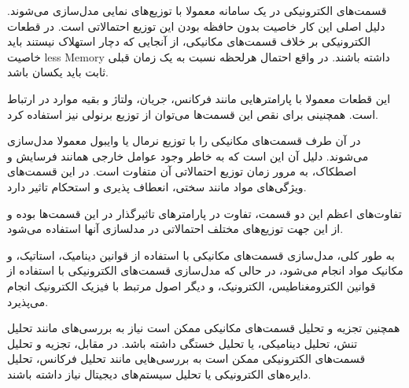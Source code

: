 قسمت‌های الکترونیکی در یک سامانه معمولا با توزیع‌های نمایی مدل‌سازی می‌شوند. دلیل اصلی این کار خاصیت بدون حافظه بودن این توزیع احتمالاتی است. در قطعات الکترونیکی بر خلاف قسمت‌های مکانیکی، از آنجایی که دچار استهلاک نیستند باید خاصیت
less Memory 
داشته باشند. در واقع احتمال هرلحظه نسبت به یک زمان قبلی ثابت باید یکسان باشد.

این قطعات معمولا با پارامترهایی مانند فرکانس، جریان،‌ ولتاژ و بقیه موارد در ارتباط است. همچنینی برای نقص این قسمت‌ها می‌توان از توزیع برنولی نیز استفاده کرد.

در آن طرف قسمت‌های مکانیکی را با توزیع نرمال یا وایبول معمولا مدل‌سازی می‌شوند. دلیل آن این است که به خاطر وجود عوامل خارجی همانند فرسایش و اصطکاک،‌ به مرور زمان توزیع احتمالاتی آن متفاوت است. در این قسمت‌های ویژگی‌های مواد مانند سختی، انعطاف پذیری و استحکام تاثیر دارد.

تفاوت‌های اعظم این دو قسمت، تفاوت در پارامترهای تاثیرگذار در این قسمت‌ها بوده و از این جهت توزیع‌های مختلف احتمالاتی در مدلسازی آنها استفاده می‌شود.

به طور کلی، مدل‌سازی قسمت‌های مکانیکی با استفاده از قوانین دینامیک، استاتیک، و مکانیک مواد انجام می‌شود، در حالی که مدل‌سازی قسمت‌های الکترونیکی با استفاده از قوانین الکترومغناطیس، الکترونیک، و دیگر اصول مرتبط با فیزیک الکترونیک انجام می‌پذیرد.

همچنین تجزیه و تحلیل قسمت‌های مکانیکی ممکن است نیاز به بررسی‌های مانند تحلیل تنش، تحلیل دینامیکی، یا تحلیل خستگی داشته باشد. در مقابل، تجزیه و تحلیل قسمت‌های الکترونیکی ممکن است به بررسی‌هایی مانند تحلیل فرکانس، تحلیل دایره‌های الکترونیکی یا تحلیل سیستم‌های دیجیتال نیاز داشته باشند.